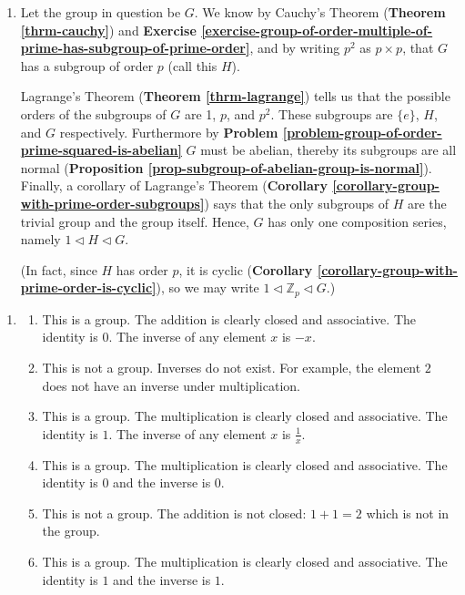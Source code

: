 \begin{enumerate}
    \item Let the group in question be $G$. We know by Cauchy's Theorem (\textbf{Theorem \ref{thrm-cauchy}}) and \textbf{Exercise \ref{exercise-group-of-order-multiple-of-prime-has-subgroup-of-prime-order}}, and by writing $p^2$ as $p \times p$, that $G$ has a subgroup of order $p$ (call this $H$).
    
    Lagrange's Theorem (\textbf{Theorem \ref{thrm-lagrange}}) tells us that the possible orders of the subgroups of $G$ are 1, $p$, and $p^2$. These subgroups are $\{e\}$, $H$, and $G$ respectively. Furthermore by \textbf{Problem \ref{problem-group-of-order-prime-squared-is-abelian}} $G$ must be abelian, thereby its subgroups are all normal (\textbf{Proposition \ref{prop-subgroup-of-abelian-group-is-normal}}). Finally, a corollary of Lagrange's Theorem (\textbf{Corollary \ref{corollary-group-with-prime-order-subgroups}}) says that the only subgroups of $H$ are the trivial group and the group itself. Hence, $G$ has only one composition series, namely $1 \lhd H \lhd G$.
    
    (In fact, since $H$ has order $p$, it is cyclic (\textbf{Corollary \ref{corollary-group-with-prime-order-is-cyclic}}), so we may write $1 \lhd \mathbb{Z}_p \lhd G$.)
\end{enumerate}


\begin{enumerate}
    \item \begin{enumerate}[label=(\alph*)]
        \item This is a group. The addition is clearly closed and associative. The identity is 0. The inverse of any element $x$ is $-x$.
        \item This is not a group. Inverses do not exist. For example, the element $2$ does not have an inverse under multiplication.
        \item This is a group. The multiplication is clearly closed and associative. The identity is $1$. The inverse of any element $x$ is $\frac1x$.
        \item This is a group. The multiplication is clearly closed and associative. The identity is $0$ and the inverse is $0$.
        \item This is not a group. The addition is not closed: $1 + 1 = 2$ which is not in the group.
        \item This is a group. The multiplication is clearly closed and associative. The identity is $1$ and the inverse is $1$.
    \end{enumerate}
\end{enumerate}

